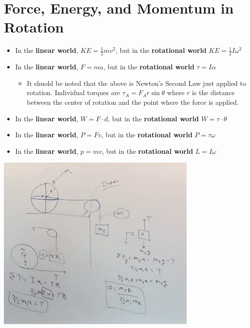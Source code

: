 \section{Force, Energy, and Momentum in Rotation}

\begin{itemize}
    \item In the \textbf{linear world}, $KE = \frac{1}{2}mv^2$, but in the \textbf{rotational world} $KE = \frac{1}{2}I\omega^2$
    \item  In the \textbf{linear world}, $F = ma$, but in the \textbf{rotational world} $\tau = I\alpha$
    \begin{itemize}
        \item It shuold be noted that the above is Newton's Second Law just applied to rotation. Individual torques are $\tau_A = F_Ar\sin\theta$ where $r$ is the distance between the center of rotation and the point where the force is applied.
    \end{itemize}
    \item In the \textbf{linear world}, $W = F \cdot d$, but in the \textbf{rotational world} $W = \tau \cdot \theta$
    \item In the \textbf{linear world}, $P = Fv$, but in the \textbf{rotational world} $P = \tau\omega$
    \item In the \textbf{linear world}, $p = mv$, but in the \textbf{rotational world} $L = I\omega$
\end{itemize}

\begin{problem}
    \begin{center}
        \includegraphics[width=0.75\textwidth]{chapters/ch5/images/fig5_1.PNG}
    \end{center}
\end{problem}

